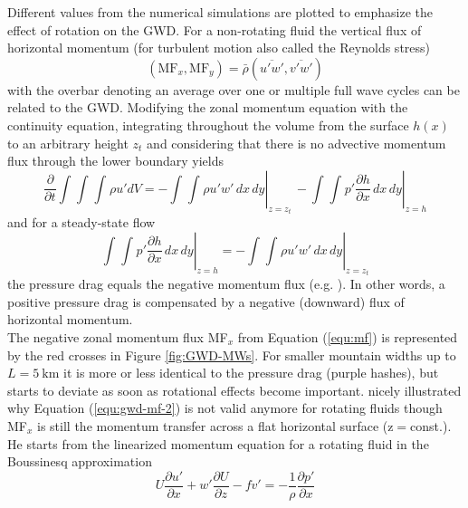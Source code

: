 Different values from the numerical simulations are plotted to emphasize the effect of rotation on the GWD. For a non-rotating fluid the vertical flux of horizontal momentum (for turbulent motion also called the Reynolds stress)
\begin{equation}
    (\mathrm{MF}_x, \mathrm{MF}_y) = \bar{\rho}  (\overbar{u'w'},\overbar{v'w'})
    \label{equ:mf}
\end{equation}
with the overbar denoting an average over one or multiple full wave cycles can be related to the GWD. Modifying the zonal momentum equation with the continuity equation, integrating throughout the volume from the surface $h(x)$ to an arbitrary height $z_t$ and considering that there is no advective momentum flux through the lower boundary yields
\begin{equation}
    \frac{\partial}{\partial t}\int_{}^{} \int_{}^{} \int_{}^{} \rho u' dV = - \left.\int_{}^{} \int_{}^{} \rho u'w' \, dx \, dy \right\vert_{z=z_t}  \,
    - \left.\int_{}^{} \int_{}^{} p' \frac{\partial h}{\partial x} \, dx \, dy \right\vert_{z=h}
    \label{equ:gwd-mf}
\end{equation}
and for a steady-state flow
\begin{equation}
    \left.\int_{}^{} \int_{}^{} p' \frac{\partial h}{\partial x} \, dx \, dy \right\vert_{z=h} =  -\left.\int_{}^{}  \int_{}^{} \rho u'w' \, dx \, dy \right\vert_{z=z_t}
    \label{equ:gwd-mf-2}
\end{equation}
the pressure drag equals the negative momentum flux (e.g. \cite[]{durran_lee_2003}). In other words, a positive pressure drag is compensated by a negative (downward) flux of horizontal momentum. \\
The negative zonal momentum flux MF$_x$ from Equation (\ref{equ:mf}) is represented by the red crosses in Figure \ref{fig:GWD-MWs}. For smaller mountain widths up to $L=\SI{5}{\kilo\meter}$ it is more or less identical to the pressure drag (purple hashes), but starts to deviate as soon as rotational effects become important. \textcite[]{bretherton_momentum_1969} nicely illustrated why Equation (\ref{equ:gwd-mf-2}) is not valid anymore for rotating fluids though MF$_x$ is still the momentum transfer across a flat horizontal surface (z$=$const.). He starts from the linearized momentum equation for a rotating fluid in the Boussinesq approximation
\begin{equation}
    U \frac{\partial u'}{\partial x} + w' \frac{\partial U}{\partial z} - f v' = -\frac{1}{\rho} \frac{\partial p'}{\partial x}
    \label{equ:momEqu-rotating}
\end{equation}
